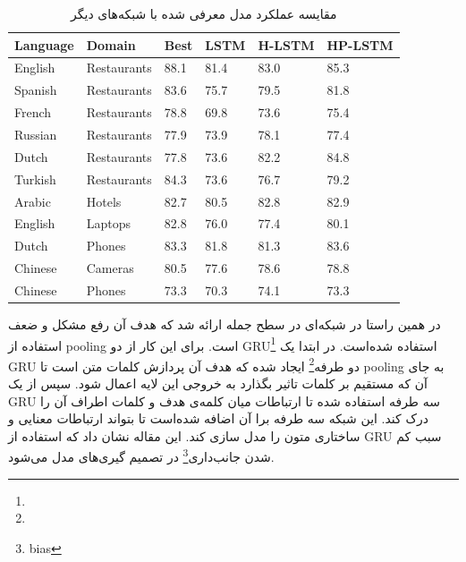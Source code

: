 \documentclass[12pt, a4paper, oneside]{report}
\begin{document}
\begin{table}[h]
    \begin{small}
    \begin{center}
      \begin{latin}
      \begin{tabular}{|l|l|l|l|l|l|}
        \hline
        Language & Domain & Best & LSTM & H-LSTM &  HP-LSTM \\
        \hline
        English & Restaurants & 88.1 & 81.4 & 83.0 & 85.3 \\
        \hline
        Spanish & Restaurants & 83.6 & 75.7 & 79.5 & 81.8 \\
        \hline
        French & Restaurants & 78.8 & 69.8 & 73.6 & 75.4 \\
        \hline
        Russian & Restaurants & 77.9 & 73.9 & 78.1 & 77.4 \\
        \hline
        Dutch & Restaurants & 77.8 & 73.6 & 82.2 & 84.8 \\
        \hline
        Turkish & Restaurants & 84.3 & 73.6 & 76.7 & 79.2 \\
        \hline
        Arabic & Hotels & 82.7 & 80.5 & 82.8 & 82.9 \\
        \hline
        English & Laptops & 82.8 & 76.0 & 77.4 & 80.1 \\
        \hline
        Dutch & Phones & 83.3 & 81.8 & 81.3 & 83.6 \\
        \hline
        Chinese & Cameras & 80.5 & 77.6 & 78.6 & 78.8 \\
        \hline
        Chinese & Phones & 73.3 & 70.3 & 74.1 & 73.3 \\
        \hline
      \end{tabular}
      \end{latin}
      \caption{مقایسه عملکرد مدل معرفی شده با شبکه‌های دیگر}
      \label{tab:H-LSTM}
    \end{center}
\end{small}
  \end{table}

در همین راستا در
\cite{72Zhang_Zhang_Vo_2016}
شبکه‌ای در سطح جمله ارائه شد که هدف آن رفع مشکل و ضعف استفاده از
pooling
است. برای این کار از دو
GRU\footnote{}
استفاده شده‌است. در ابتدا یک
GRU
دو طرفه\footnote{}
ایجاد شده که هدف آن پردازش کلمات متن است تا
pooling
به جای آن که مستقیم بر کلمات تاثیر بگذارد به خروجی این لایه اعمال شود. سپس از یک
GRU
سه طرفه استفاده شده تا ارتباطات میان کلمه‌ی هدف و کلمات اطراف آن را درک کند.
این شبکه سه طرفه برا آن اضافه شده‌است تا بتواند ارتباطات معنایی و ساختاری متون را مدل سازی کند.
این مقاله نشان داد که استفاده از
GRU
سبب کم شدن جانب‌داری\footnote{bias}
در تصمیم گیری‌های مدل می‌شود.
\end{document}
